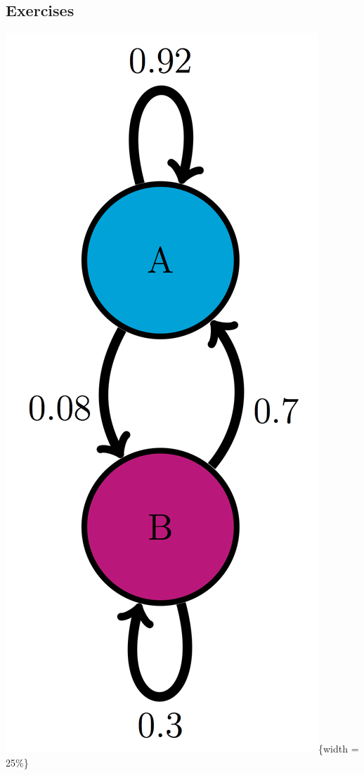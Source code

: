 \documentclass[
  letterpaper,
  DIV=11,
  numbers=noendperiod]{scrreprt}
\begin{document}
\hypertarget{exercises-30}{%
\subsection{Exercises}\label{exercises-30}}

\includegraphics{./ch10/AB_trans_diag.png}\{width = 25\%\}
\end{document}
